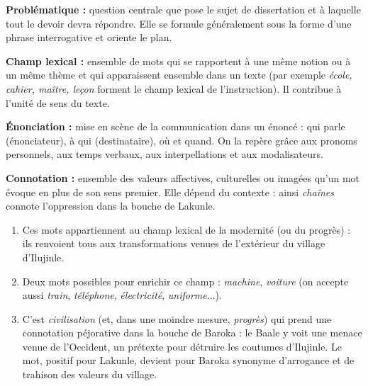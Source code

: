 \documentclass[11pt]{article}
\newcommand{\cle}[1]{{\popxbold\color{popdark}#1}}
\newcounter{popsec}
\newcounter{popsub}
\newcommand{\courssub}[1]{%
  \stepcounter{popsub}%
  \par\vspace{9pt}\noindent{\popxbold\fontsize{11.5}{13}\selectfont\color{popink}{\color{poporange}\thepopsec.\thepopsub}\hspace{6pt}#1}\par\nopagebreak\vspace{4pt}
}
\begin{document}
\begin{corrige}
\textbf{Problématique :} question centrale que pose le sujet de dissertation et à laquelle tout le devoir devra répondre. Elle se formule généralement sous la forme d'une phrase interrogative et oriente le plan.

\textbf{Champ lexical :} ensemble de mots qui se rapportent à une même notion ou à un même thème et qui apparaissent ensemble dans un texte (par exemple \emph{école, cahier, maître, leçon} forment le champ lexical de l'instruction). Il contribue à l'unité de sens du texte.

\textbf{Énonciation :} mise en scène de la communication dans un énoncé : qui parle (\cle{énonciateur}), à qui (\cle{destinataire}), où et quand. On la repère grâce aux pronoms personnels, aux temps verbaux, aux interpellations et aux modalisateurs.

\textbf{Connotation :} ensemble des valeurs affectives, culturelles ou imagées qu'un mot évoque en plus de son sens premier. Elle dépend du contexte : ainsi \emph{chaînes} connote l'oppression dans la bouche de Lakunle.
\end{corrige}

\begin{corrige}
\begin{enumerate}
\item Ces mots appartiennent au \cle{champ lexical de la modernité} (ou du progrès) : ils renvoient tous aux transformations venues de l'extérieur du village d'Ilujinle.
\item Deux mots possibles pour enrichir ce champ : \emph{machine}, \emph{voiture} (on accepte aussi \emph{train}, \emph{téléphone}, \emph{électricité}, \emph{uniforme}...).
\item C'est \emph{civilisation} (et, dans une moindre mesure, \emph{progrès}) qui prend une connotation péjorative dans la bouche de Baroka : le Baale y voit une menace venue de l'Occident, un prétexte pour détruire les coutumes d'Ilujinle. Le mot, positif pour Lakunle, devient pour Baroka synonyme d'arrogance et de trahison des valeurs du village.
\end{enumerate}
\end{corrige}

\courssub{Je m'entraîne}
\end{document}
